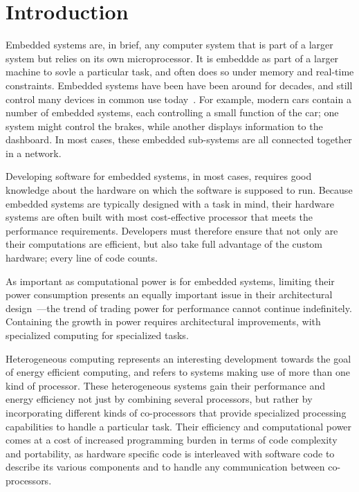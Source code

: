 \documentclass[../main.tex]{subfiles}
\begin{document}
\chapter{Introduction}
\label{intro}

Embedded systems are, in brief, any computer system that is part of a larger system but relies on its own microprocessor. It is embeddde as part of a larger machine to sovle a particular task, and often does so under memory and real-time constraints. Embedded systems have been have been around for decades, and still control many devices in common use today~\cite{barr2006}. For example, modern cars contain a number of embedded systems, each controlling a small function of the car; one system might control the brakes, while another displays information to the dashboard. In most cases, these embedded sub-systems are all connected together in a network. 

Developing software for embedded systems, in most cases, requires good knowledge about the hardware on which the software is supposed to run. Because embedded systems are typically designed with a task in mind, their hardware systems are often built with most cost-effective processor that meets the performance requirements. Developers must therefore ensure that not only are their computations are efficient, but also take full advantage of the custom hardware; every line of code counts.

As important as computational power is for embedded systems, limiting their power consumption presents an equally important issue in their architectural design~\cite{mudge2001}---the trend of trading power for performance cannot continue indefinitely. Containing the growth in power requires architectural improvements, with specialized computing for specialized tasks.

Heterogeneous computing represents an interesting development towards the goal of energy efficient computing, and refers to systems making use of more than one kind of processor. These heterogeneous systems gain their performance and energy efficiency not just by combining several processors, but rather by incorporating different kinds of co-processors that provide specialized processing capabilities to handle a particular task. Their efficiency and computational power comes at a cost of increased programming burden in terms of code complexity and portability, as hardware specific code is interleaved with software code to describe its various components and to handle any communication between co-processors.
\end{document}
